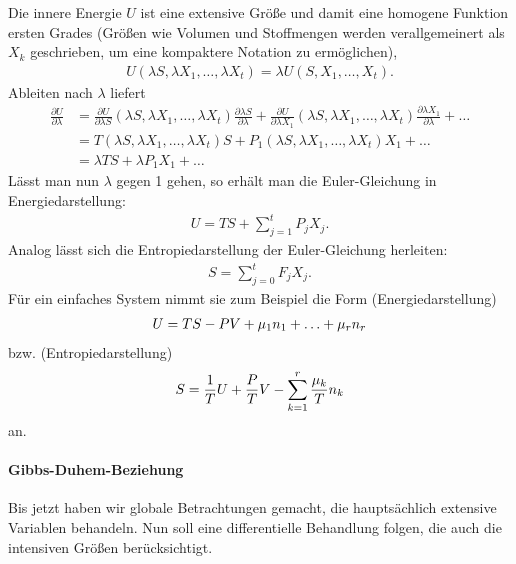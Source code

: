 Die innere Energie $U$ ist eine extensive Größe und damit eine homogene Funktion ersten Grades (Größen wie Volumen und Stoffmengen werden verallgemeinert als $X_k$ geschrieben, um eine kompaktere Notation zu ermöglichen),
\begin{align*}
    U(\lambda S,\lambda X_1,\ldots,\lambda X_t) = \lambda U(S,X_1,\ldots,X_t).
\end{align*}
Ableiten nach $\lambda$ liefert
\begin{align*}
    \frac{\partial U}{\partial\lambda} & = \frac{\partial U}{\partial\lambda S}(\lambda S,\lambda X_1,\ldots,\lambda X_t) \frac{\partial\lambda S}{\partial\lambda} + \frac{\partial U}{\partial\lambda X_1}(\lambda S,\lambda X_1,\ldots,\lambda X_t) \frac{\partial\lambda X_1}{\partial\lambda} + \ldots \\
                                       & = T(\lambda S,\lambda X_1,\ldots,\lambda X_t)S + P_1 (\lambda S,\lambda X_1,\ldots,\lambda X_t) X_1 + \ldots                                                                                                                                                       \\
                                       & = \lambda TS + \lambda P_1X_1 + \ldots
\end{align*}
Lässt man nun $\lambda$ gegen 1 gehen, so erhält man die Euler-Gleichung in Energiedarstellung:
\begin{align}
    \label{eq:euler_gleichung_energiedarstellung}
    \boxed{U = TS + \sum_{j=1}^t P_j X_j.}
\end{align}
Analog lässt sich die Entropiedarstellung der Euler-Gleichung herleiten:
\begin{align}
    \label{eq:euler_gleichung_entropiedarstellung}
    \boxed{S = \sum_{j=0}^t F_j X_j.}
\end{align}
Für ein einfaches System nimmt sie zum Beispiel die Form (Energiedarstellung)
\begin{align*}
    U=TS-PV + \mu_1 n_1+\ldots + \mu_r n_r
\end{align*}
bzw. (Entropiedarstellung)
\begin{align*}
    S=\frac{1}{T}U + \frac{P}{T}V - \sum_{k=1}^r \frac{\mu_k}{T}n_k
\end{align*}
an.


\paragraph*{Gibbs-Duhem-Beziehung}

Bis jetzt haben wir globale Betrachtungen gemacht, die hauptsächlich extensive Variablen behandeln. Nun soll eine differentielle Behandlung folgen, die auch die intensiven Größen berücksichtigt.

